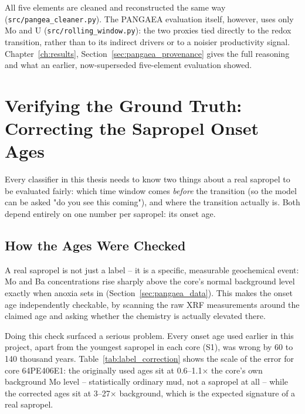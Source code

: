 All five elements are cleaned and reconstructed the same way (\texttt{src/pangea\_cleaner.py}). The PANGAEA evaluation itself, however, uses only Mo and U (\texttt{src/rolling\_window.py}): the two proxies tied directly to the redox transition, rather than to its indirect drivers or to a noisier productivity signal. Chapter~\ref{ch:results}, Section~\ref{sec:pangaea_provenance} gives the full reasoning and what an earlier, now-superseded five-element evaluation showed.

\section{Verifying the Ground Truth: Correcting the Sapropel Onset Ages}
\label{sec:label_correction}

Every classifier in this thesis needs to know two things about a real sapropel to be evaluated fairly: which time window comes \emph{before} the transition (so the model can be asked "do you see this coming"), and where the transition actually is. Both depend entirely on one number per sapropel: its onset age.

\subsection{How the Ages Were Checked}

A real sapropel is not just a label -- it is a specific, measurable geochemical event: Mo and Ba concentrations rise sharply above the core's normal background level exactly when anoxia sets in (Section~\ref{sec:pangaea_data}). This makes the onset age independently checkable, by scanning the raw XRF measurements around the claimed age and asking whether the chemistry is actually elevated there.

Doing this check surfaced a serious problem. Every onset age used earlier in this project, apart from the youngest sapropel in each core (S1), was wrong by 60 to 140 thousand years. Table~\ref{tab:label_correction} shows the scale of the error for core 64PE406E1: the originally used ages sit at 0.6--1.1$\times$ the core's own background Mo level -- statistically ordinary mud, not a sapropel at all -- while the corrected ages sit at 3--27$\times$ background, which is the expected signature of a real sapropel.


